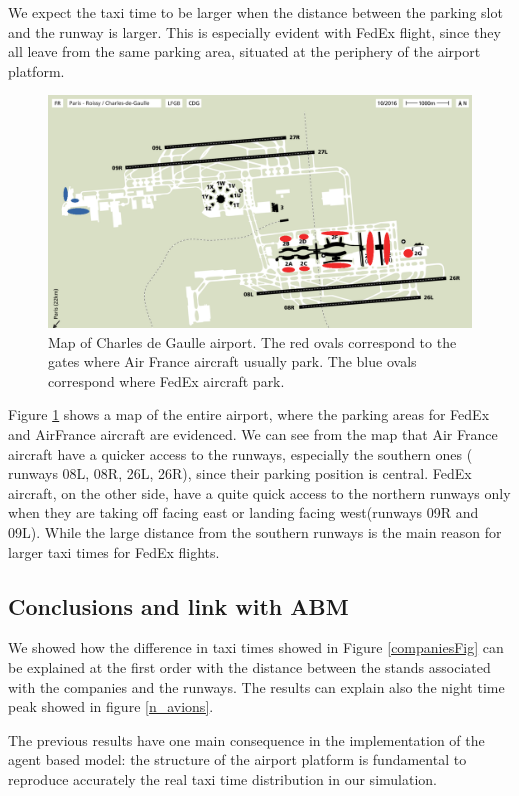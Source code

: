 \documentclass{article}
\begin{document}
We expect the taxi time to be larger when the distance between the parking slot and the runway is larger. This is especially evident with FedEx flight, since they all leave from the same parking area, situated at the periphery of the airport platform.

\begin{figure}[h]
	\centering
	\includegraphics[width=\textwidth]{map_airport_filled}
	\caption{Map of Charles de Gaulle airport. The red ovals correspond to the gates where Air France aircraft usually park. The blue ovals correspond where FedEx aircraft park.}
	\label{map}
\end{figure}

Figure \ref{map} shows a map of the entire airport, where the parking areas for FedEx and AirFrance aircraft are evidenced.
We can see from the map that Air France aircraft have a quicker access to the runways, especially the southern ones ( runways 08L, 08R, 26L, 26R), since their parking position is central. FedEx aircraft, on the other side, have a quite quick access to the northern runways only when they are taking off facing east or landing facing west(runways 09R and 09L). While the large distance from the southern runways is the main reason for larger taxi times for FedEx flights.


\subsection{Conclusions and link with ABM}
We showed how the difference in taxi times showed in Figure \ref{companiesFig} can be explained at the first order with the distance between the stands associated with the companies and the runways. The results can explain also the night time peak showed in figure \ref{n_avions}.

The previous results have one main consequence in the implementation of the agent based model: the structure of the airport platform is fundamental to reproduce accurately the real taxi time distribution in our simulation.
\end{document}
